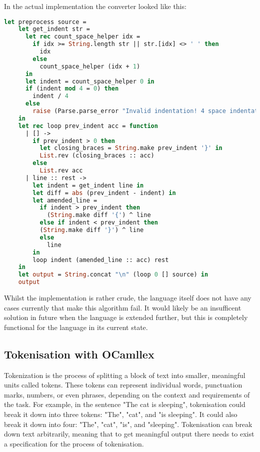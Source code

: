 \documentclass{l4proj}
\begin{document}
In the actual implementation the converter looked like this:

\begin{lstlisting}[language=Caml, caption=The 'preprocess' function that handles all whitespace scoping in PyFunc.]
let preprocess source =
    let get_indent str = 
      let rec count_space_helper idx = 
        if idx >= String.length str || str.[idx] <> ' ' then
          idx
        else
          count_space_helper (idx + 1)
      in
      let indent = count_space_helper 0 in
      if (indent mod 4 = 0) then
        indent / 4
      else
        raise (Parse.parse_error "Invalid indentation! 4 space indentation required.")
    in
    let rec loop prev_indent acc = function
      | [] -> 
        if prev_indent > 0 then
          let closing_braces = String.make prev_indent '}' in
          List.rev (closing_braces :: acc)
        else 
          List.rev acc
      | line :: rest ->
        let indent = get_indent line in
        let diff = abs (prev_indent - indent) in
        let amended_line =
          if indent > prev_indent then
            (String.make diff '{') ^ line
          else if indent < prev_indent then
          (String.make diff '}') ^ line
          else
            line
        in
        loop indent (amended_line :: acc) rest
    in
    let output = String.concat "\n" (loop 0 [] source) in
    output
\end{lstlisting}

Whilst the implementation is rather crude, the language itself does not have any cases currently that make this algorithm fail.
It would likely be an insufficent solution in future when the language is extended further, but this is completely functional for the language in its current state.


\subsection{Tokenisation with OCamllex}

Tokenization is the process of splitting a block of text into smaller, meaningful units called tokens.
These tokens can represent individual words, punctuation marks, numbers, or even phrases, depending on the context and requirements of the task.
For example, in the sentence "The cat is sleeping", tokenisation could break it down into three tokens: "The", "cat", and "is sleeping".
It could also break it down into four: "The", "cat", "is", and "sleeping".
Tokenisation can break down text arbitrarily, meaning that to get meaningful output there needs to exist a specification for the process of tokenisation.
\end{document}
